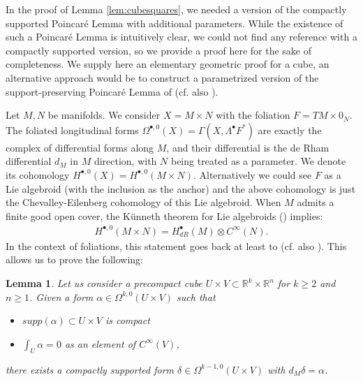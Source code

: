 \documentclass{article}
\newtheorem{Lemma}[Theorem]{Lemma}
\theoremstyle{definition}
\begin{document}
In the proof of Lemma \ref{lem:cubesquares}, we needed a version of the compactly supported Poincaré Lemma with additional parameters. While the existence of such a Poincaré Lemma is intuitively clear, we could not find any reference with a compactly supported version, so we provide a proof here for the sake of completeness. We supply here an elementary geometric proof for a cube, an alternative approach would be to construct a parametrized version of the support-preserving Poincaré Lemma of \cite{Bogovskii1980SolutionOS} (cf. also \cite{nutzi2024supportpreservinghomotopyrham}).

Let $M,N$ be manifolds. We consider $X=M\times N$ with the foliation $F=TM\times 0_N$. The foliated longitudinal forms $\Omega^{\bullet,0}(X)=\Gamma(X,\Lambda^\bullet F^*)$ are exactly the complex of differential forms along $M$, and their differential is the de Rham differential $d_M$ in $M$ direction, with $N$ being treated as a parameter. We denote its cohomology $H^{\bullet,0}(X)=H^{\bullet,0}(M\times N)$. 
Alternatively we could see $F$ as a Lie algebroid (with the inclusion as the anchor) and the above cohomology is just the Chevalley-Eilenberg cohomology of this Lie algebroid. When $M$  admits a finite good open cover, the K\"unneth theorem for Lie algebroids (\cite[Theorem 6.6]{JotzMarchesini2024}) implies:
\begin{align*}
    H^{\bullet,0}(M\times N)=H^\bullet_{dR}(M)\otimes C^\infty(N).
\end{align*}
In the context of foliations, this statement goes back at least to \cite{ElKacimiAlaoui1983} (cf. also \cite{Bertelson2011}). This allows us to prove the following:
\begin{Lemma}\label{lem:PoincParam}
  Let  us consider a precompact cube $U\times V\subset \mathbb R^k\times \mathbb R^{n}$ for $k\geq 2$ and $n\geq 1$.   Given a  form $\alpha\in\Omega^{k,0}(U\times V)$ such that
\begin{itemize}
    \item $supp(\alpha)\subset U \times V$ is compact
    \item $\int_U\alpha=0$ as an element of $C^\infty(V)$,
\end{itemize} 

there exists a compactly supported form $\delta\in \Omega^{k-1,0}(U\times V)$ with $d_M\delta=\alpha$.
\end{Lemma}
\end{document}
